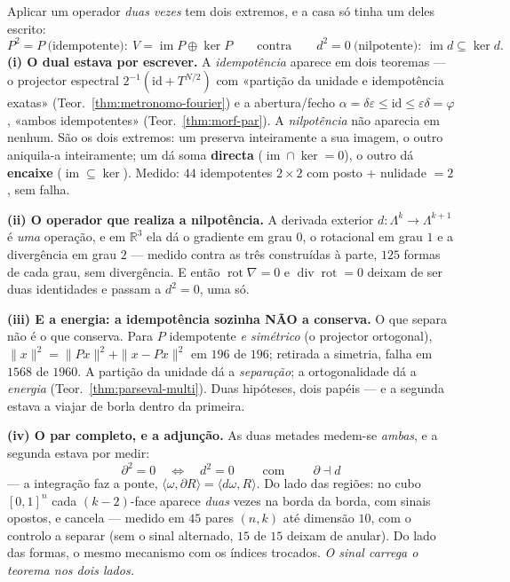 \documentclass[livro.tex]{subfiles}
\begin{document}
\begin{teorema}\label{thm:nilpotencia-dual}
Aplicar um operador \emph{duas vezes} tem dois extremos, e a casa só tinha
um deles escrito:
\[
\boxed{
P^{2}=P\ \text{(idempotente)}:\ V=\operatorname{im}P\oplus\ker P
\qquad\text{contra}\qquad
d^{2}=0\ \text{(nilpotente)}:\ \operatorname{im}d\subseteq\ker d.
}
\]
\textbf{(i) O dual estava por escrever.} A \emph{idempotência} aparece em
dois teoremas --- o projector espectral
$2^{-1}(\mathrm{id}+T^{N/2})$ com «partição da unidade e idempotência
exatas» (Teor.~\ref{thm:metronomo-fourier}) e a abertura/fecho
$\alpha=\delta\varepsilon\le\mathrm{id}\le\varepsilon\delta=\varphi$,
«ambos idempotentes» (Teor.~\ref{thm:morf-par}). A \emph{nilpotência}
não aparecia em nenhum. São os dois extremos: um preserva inteiramente
a sua imagem, o outro aniquila-a inteiramente; um dá soma
\textbf{directa} ($\operatorname{im}\cap\ker=0$), o outro dá
\textbf{encaixe} ($\operatorname{im}\subseteq\ker$). Medido:
$44$ idempotentes $2\times2$ com posto $+$ nulidade $=2$, sem falha.

\textbf{(ii) O operador que realiza a nilpotência.} A derivada exterior
$d:\Lambda^{k}\to\Lambda^{k+1}$ é \emph{uma} operação, e em
$\mathbb{R}^{3}$ ela dá o gradiente em grau $0$, o rotacional em grau
$1$ e a divergência em grau $2$ --- medido contra as três construídas
à parte, $125$ formas de cada grau, sem divergência. E então
$\operatorname{rot}\nabla=0$ e $\operatorname{div}\operatorname{rot}=0$
deixam de ser duas identidades e passam a $d^{2}=0$, uma só.

\textbf{(iii) E a energia: a idempotência sozinha NÃO a conserva.} O
que separa não é o que conserva. Para $P$ idempotente
\emph{e simétrico} (o projector ortogonal),
$\|x\|^{2}=\|Px\|^{2}+\|x-Px\|^{2}$ em $196$ de $196$; retirada a
simetria, falha em $1568$ de $1960$. A partição da unidade dá a
\emph{separação}; a ortogonalidade dá a \emph{energia}
(Teor.~\ref{thm:parseval-multi}). Duas hipóteses, dois papéis --- e a
segunda estava a viajar de borla dentro da primeira.

\textbf{(iv) O par completo, e a adjunção.} As duas metades medem-se
\emph{ambas}, e a segunda estava por medir:
\[
\boxed{\;\partial^{2}=0\quad\Longleftrightarrow\quad d^{2}=0\;}
\qquad\text{com}\qquad
\boxed{\;\partial\dashv d\;}
\]
--- a integração faz a ponte,
$\langle\omega,\partial R\rangle=\langle d\omega,R\rangle$. Do lado das
regiões: no cubo $[0,1]^{n}$ cada $(k{-}2)$-face aparece \emph{duas}
vezes na borda da borda, com sinais opostos, e cancela --- medido em
$45$ pares $(n,k)$ até dimensão $10$, com o controlo a separar (sem o
sinal alternado, $15$ de $15$ deixam de anular). Do lado das formas, o
mesmo mecanismo com os índices trocados. \emph{O sinal carrega o
teorema nos dois lados.}


\end{teorema}
\end{document}
